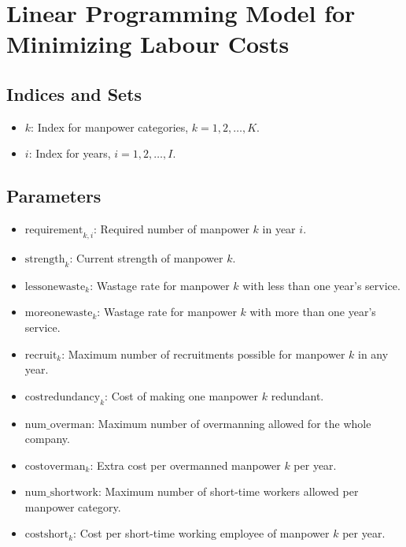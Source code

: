 \documentclass{article}
\begin{document}
\section*{Linear Programming Model for Minimizing Labour Costs}

\subsection*{Indices and Sets}
\begin{itemize}
    \item \( k \): Index for manpower categories, \( k = 1, 2, \ldots, K \).
    \item \( i \): Index for years, \( i = 1, 2, \ldots, I \).
\end{itemize}

\subsection*{Parameters}
\begin{itemize}
    \item \( \text{requirement}_{k,i} \): Required number of manpower \( k \) in year \( i \).
    \item \( \text{strength}_k \): Current strength of manpower \( k \).
    \item \( \text{lessonewaste}_k \): Wastage rate for manpower \( k \) with less than one year's service.
    \item \( \text{moreonewaste}_k \): Wastage rate for manpower \( k \) with more than one year's service.
    \item \( \text{recruit}_k \): Maximum number of recruitments possible for manpower \( k \) in any year.
    \item \( \text{costredundancy}_k \): Cost of making one manpower \( k \) redundant.
    \item \( \text{num\_overman} \): Maximum number of overmanning allowed for the whole company.
    \item \( \text{costoverman}_k \): Extra cost per overmanned manpower \( k \) per year.
    \item \( \text{num\_shortwork} \): Maximum number of short-time workers allowed per manpower category.
    \item \( \text{costshort}_k \): Cost per short-time working employee of manpower \( k \) per year.
\end{itemize}
\end{document}
